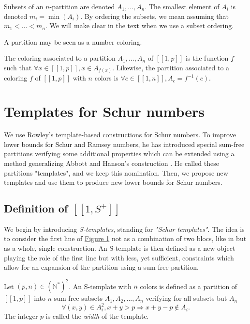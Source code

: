\documentclass[final,onefignum,onetabnum]{siamart190516}
\begin{document}
Subsets of an \(n\)-partition are denoted \(A_1, ..., A_n\). The smallest element of \(A_i\) is denoted
\(m_i = \min(A_i)\). By ordering the subsets, we mean assuming that \(m_1 < ... < m_n\). We will make clear in the text
when we use a subset ordering.

A partition may be seen as a number coloring.

\begin{definition}
The coloring associated to a partition \(A_1, ..., A_n\) of
\([\![1, p]\!]\) is the function \(f\) such that \(\forall x \in [\![1, p]\!], x \in A_{f(x)}\). Likewise, the partition associated to
a coloring \(f\) of \([\![1, p]\!]\) with \(n\) colors is \(\forall c \in [\![1, n]\!], A_c = f^{-1}(c)\).
\end{definition}


\section{Templates for Schur numbers}
\label{Schur}

We use Rowley's template-based constructions \cite{RowleyRamsey} for Schur 
numbers. To improve lower bounds for Schur and Ramsey numbers, he has introduced special sum-free 
partitions verifying some additional properties which can be extended using a method generalizing Abbott and 
Hanson's construction \cite{AbbottHanson}. He called these partitions "templates", and we keep this nomination. 
Then, we propose new templates and use them to produce new lower bounds for Schur numbers.

\subsection{Definition of \( [\![ 1, S^+ ]\!] \)}

We begin by introducing \textit{S-templates}, standing for \textit{"Schur templates"}. The idea is to consider the first line
of \hyperref[figure:1]{Figure 1} not as a combination of two blocs, like in \cite{AbbottHanson} but as a whole, single construction. 
An S-template is then defined as a new object playing the role of the first line but with less, yet sufficient, 
constraints which allow for an expansion of the partition using a sum-free partition.

\begin{definition}
Let \((p,n) \in (\mathbb{N}^*)^2\). An S-template with \(n\) colors is defined as a partition of 
\([\![1,p]\!]\) into \(n\) sum-free subsets \(A_1, A_2, ..., A_n\) verifying for all subsets but \(A_n\)
\begin{equation}
\label{eq:constemp}
\forall (x,y) \in A_i^2, x+y > p
\Longrightarrow x+y-p \notin A_i.
\end{equation}
The integer \(p\) is called the \textit{width} of the template.
\end{definition}
\end{document}

